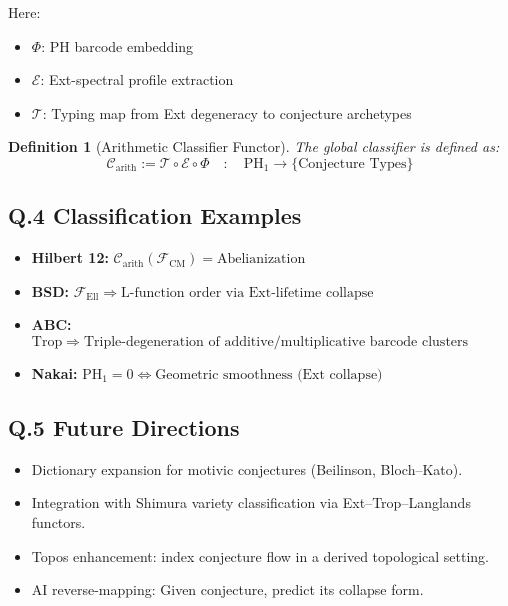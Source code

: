 \documentclass[11pt]{article}
\newtheorem{definition}[theorem]{Definition}
\begin{document}
Here:
\begin{itemize}
  \item \( \Phi \): PH barcode embedding
  \item \( \mathcal{E} \): Ext-spectral profile extraction
  \item \( \mathcal{T} \): Typing map from Ext degeneracy to conjecture archetypes
\end{itemize}

\begin{definition}[Arithmetic Classifier Functor]
The global classifier is defined as:
\[
\mathscr{C}_{\mathrm{arith}} := \mathcal{T} \circ \mathcal{E} \circ \Phi
\quad : \quad \mathrm{PH}_1 \to \{ \text{Conjecture Types} \}
\]
\end{definition}

\subsection*{Q.4 Classification Examples}

\begin{itemize}
  \item \textbf{Hilbert 12:} \( \mathscr{C}_{\mathrm{arith}}(\mathcal{F}_{\mathrm{CM}}) = \text{Abelianization} \)
  \item \textbf{BSD:} \( \mathcal{F}_{\mathrm{Ell}} \Rightarrow \text{L-function order via Ext-lifetime collapse} \)
  \item \textbf{ABC:} \( \mathrm{Trop} \Rightarrow \text{Triple-degeneration of additive/multiplicative barcode clusters} \)
  \item \textbf{Nakai:} \( \mathrm{PH}_1 = 0 \Leftrightarrow \text{Geometric smoothness (Ext collapse)} \)
\end{itemize}

\subsection*{Q.5 Future Directions}

\begin{itemize}
  \item Dictionary expansion for motivic conjectures (Beilinson, Bloch–Kato).
  \item Integration with Shimura variety classification via Ext–Trop–Langlands functors.
  \item Topos enhancement: index conjecture flow in a derived topological setting.
  \item AI reverse-mapping: Given conjecture, predict its collapse form.
\end{itemize}
\end{document}

